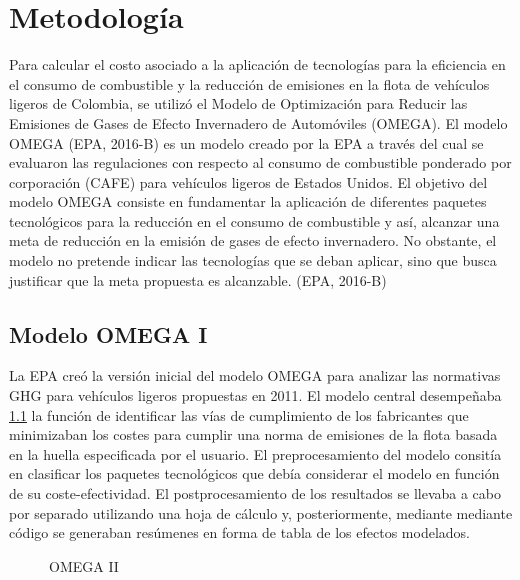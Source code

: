 
\chapter{Metodología}
\label{sec:results}


Para calcular el costo asociado a la aplicación de tecnologías para la eficiencia en el consumo de combustible y la reducción de emisiones en la flota de vehículos ligeros de Colombia, se utilizó el Modelo de Optimización para Reducir las Emisiones de Gases de Efecto Invernadero de Automóviles (OMEGA).  
El modelo OMEGA (EPA, 2016-B) \cite{EPA_2016-B}  es un modelo creado por la EPA a través del cual se evaluaron las regulaciones con respecto al consumo de combustible ponderado por corporación (CAFE) para vehículos ligeros de Estados Unidos. 
El objetivo del modelo OMEGA consiste en fundamentar la aplicación de diferentes paquetes tecnológicos para la reducción en el consumo de combustible y así, alcanzar una meta de reducción en la emisión de gases de efecto invernadero. No obstante, el modelo no pretende indicar las tecnologías que se deban aplicar, sino que busca justificar que la meta propuesta es alcanzable. (EPA, 2016-B) \cite{EPA_2016-B} 

\section{Modelo OMEGA I}
\label{sec:omega}

La EPA creó la versión inicial del modelo OMEGA para analizar las normativas GHG para vehículos ligeros propuestas en 2011. El modelo central desempeñaba \ref{fig:omega1} la función de identificar las vías de cumplimiento de los fabricantes que minimizaban los costes para cumplir una norma de emisiones de la flota basada en la huella especificada por el usuario. El preprocesamiento del modelo consitía en clasificar los paquetes tecnológicos que debía considerar el modelo en función de su coste-efectividad. El postprocesamiento de los resultados se llevaba a cabo por separado utilizando una hoja de cálculo y, posteriormente, mediante mediante código se generaban resúmenes en forma de tabla de los efectos modelados.

\begin{figure}[htbp]
   \centering
   
    \caption{OMEGA II}
    \label{fig:omega1}
\end{figure}

